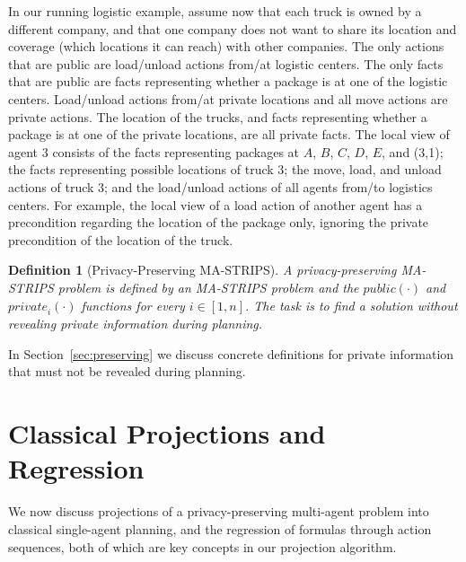 \documentclass[letterpaper]{article}
\newcommand{\private}[2]{\textit{private}_{#1}(#2)}
\newcommand{\public}{\textit{public}}
\newtheorem{definition}{Definition}
\theoremstyle{definition}
\begin{document}
In our running logistic example, assume now that each truck is owned by a different company, and that one company does not want to share its location and coverage (which locations it can reach) with other companies.
The only actions that are public are load/unload actions from/at logistic centers. The only facts that are public are facts representing whether a package is at one of the logistic centers. Load/unload actions from/at private locations and all move actions are private actions. The location of the trucks, and facts representing whether a package is at one of the private locations, are all private facts.
The local view of agent 3 consists of the facts representing
packages at $A$, $B$, $C$, $D$, $E$, and (3,1);
the facts representing possible locations of truck $3$;
the move, load, and unload actions of truck $3$;
and the load/unload actions of all agents from/to logistics centers.
For example, the local view of a load action of another agent has a precondition regarding the location of the package only, ignoring the private precondition of the location of the truck.





\begin{definition}[Privacy-Preserving MA-STRIPS]
A privacy-preserving MA-STRIPS problem is defined by an MA-STRIPS problem and the $\public(\cdot)$ and $\private{i}{\cdot}$ functions for every $i\in[1,n]$. The task is to find a solution without revealing private information during planning.
\label{def:private-ma-strips}
\end{definition}

In Section~\ref{sec:preserving} we discuss concrete definitions for private information that must not be revealed during planning.


\section{Classical Projections and Regression}

We now discuss projections of a privacy-preserving multi-agent problem into classical single-agent planning, and the regression of formulas through action sequences, both of which are key concepts in our projection algorithm.
\end{document}
